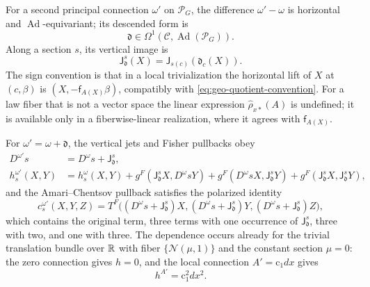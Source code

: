 For a second principal connection \(\omega'\) on \(\mathscr P_G\), the difference \(\omega'-\omega\)
is horizontal and \(\operatorname{Ad}\)-equivariant; its descended form is
\begin{equation}
\mathfrak d\in\Omega^1(\mathcal C,\operatorname{Ad}(\mathscr P_G)).
\label{eq:pb-connection-difference}
\end{equation}
Along a section \(s\), its vertical image is
\begin{equation}
\mathsf J^s_{\mathfrak d}(X)=\mathsf J_{s(c)}(\mathfrak d_c(X)).
\label{eq:pb-connection-difference-vertical}
\end{equation}
The sign convention is that in a local trivialization the horizontal lift of \(X\) at \((c,\beta)\) is
\((X,-\mathsf f_{A(X)}\beta)\), compatibly with \eqref{eq:geo-quotient-convention}. For a law fiber that
is not a vector space the linear expression \(\widehat\rho_{x*}(A)\) is undefined; it is available only
in a fiberwise-linear realization, where it agrees with \(\mathsf f_{A(X)}\).

For \(\omega'=\omega+\mathfrak d\), the vertical jets and Fisher pullbacks obey
\begin{align}
D^{\omega'}s
&=D^\omega s+\mathsf J^s_{\mathfrak d},
\label{eq:pb-jet-connection-change}\\
h_s^{\omega'}(X,Y)
&=h_s^\omega(X,Y)
+g^F(\mathsf J^s_{\mathfrak d}X,D^\omega sY)
+g^F(D^\omega sX,\mathsf J^s_{\mathfrak d}Y)
+g^F(\mathsf J^s_{\mathfrak d}X,\mathsf J^s_{\mathfrak d}Y),
\label{eq:pb-fisher-connection-change}
\end{align}
and the Amari--Chentsov pullback satisfies the polarized identity
\begin{equation}
c_s^{\omega'}(X,Y,Z)
=T^F\bigl((D^\omega s+\mathsf J^s_{\mathfrak d})X,
(D^\omega s+\mathsf J^s_{\mathfrak d})Y,
(D^\omega s+\mathsf J^s_{\mathfrak d})Z\bigr),
\label{eq:pb-amari-connection-change}
\end{equation}
which contains the original term, three terms with one occurrence of \(\mathsf J^s_{\mathfrak d}\),
three with two, and one with three. The dependence occurs already for the trivial translation bundle
over \(\mathbb R\) with fiber \(\{\mathcal N(\mu,1)\}\) and the constant section \(\mu=0\): the zero
connection gives \(h=0\), and the local connection \(A'=\mathrm c_1dx\) gives
\begin{equation}
h^{A'}=\mathrm c_1^2dx^2.
\label{eq:pb-connection-dependence-example}
\end{equation}

